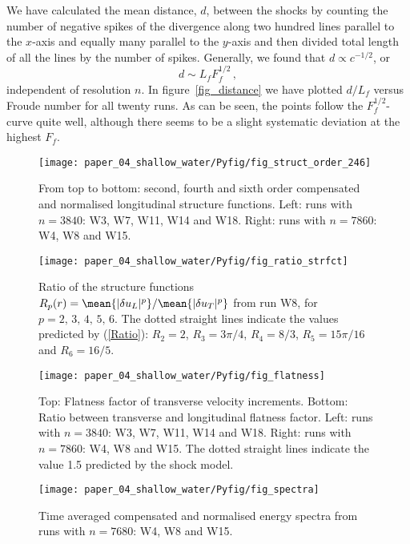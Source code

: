 We have calculated  the mean distance, $ d $, between the shocks by counting the number of negative spikes
of the divergence along two hundred lines parallel to the $ x $-axis and equally many 
parallel to the $ y $-axis and then divided total length of all the lines by
the number of spikes. Generally, we found that $ d \propto c^{-1/2} $, or
\begin{equation} \label{MeanDistance}
d \sim L_f F_f ^{1/2} \, ,
\end{equation}
independent of resolution $ n $. In figure~\ref{fig_distance} we have plotted
$ d/L_f $ versus Froude number for all twenty runs. As can be seen, the points
follow the $ F_f^{1/2} $-curve quite well, although there seems to be a slight
systematic deviation at the highest $ F_f $.
\begin{figure}
\centerline{
\texttt{[image: paper\_04\_shallow\_water/Pyfig/fig\_struct\_order\_246]}}
\caption{From top to bottom: second, fourth and sixth order compensated and
normalised longitudinal structure functions. Left: runs with $ n=3840 $: W3,
W7, W11, W14 and W18. Right: runs with $ n = 7860 $: W4, W8 and W15. }
\label{fig_StrucFunc}
\end{figure}

\begin{figure}
\centerline{\texttt{[image: paper\_04\_shallow\_water/Pyfig/fig\_ratio\_strfct]}}
\caption{
Ratio of the structure functions
$R_p(r) = \mean{|\delta u_L|^p} / \mean{|\delta u_T|^p}$ from run W8,
for $ p = 2, \, 3, \, 4, \, 5, \, 6. $
The dotted straight lines indicate the values predicted by (\ref{Ratio}):
$R_2 = 2$, $R_3 = 3\pi/4$,  $R_4 = 8/3$, $ R_5 = 15 \pi /16 $ and $ R_6 = 16/5 $.}
\label{fig_ratio}
\end{figure}

\begin{figure}
\centerline{\texttt{[image: paper\_04\_shallow\_water/Pyfig/fig\_flatness]}}
\caption{ Top: Flatness factor of transverse velocity increments. Bottom: Ratio between transverse and longitudinal flatness factor. Left: runs with $ n=3840 $: W3,
W7, W11,  W14 and W18. Right: runs with $ n = 7860 $: W4, W8 and W15.  The dotted straight lines indicate the value 1.5 predicted by the shock model.  }
\label{fig_flatness}
\end{figure}

\begin{figure}
\centerline{\texttt{[image: paper\_04\_shallow\_water/Pyfig/fig\_spectra]}}
\caption{Time averaged compensated and normalised energy spectra
from runs with $ n = 7680 $: W4, W8 and W15.}
\label{fig_spectra_c40}
\end{figure}

